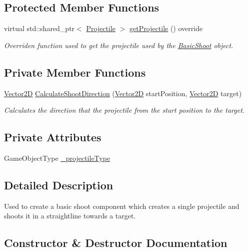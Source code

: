 \subsection*{Protected Member Functions}
\begin{DoxyCompactItemize}
\item 
virtual std\+::shared\+\_\+ptr$<$ \hyperlink{class_projectile}{Projectile} $>$ \hyperlink{class_basic_shoot_ab5058d147ca9d9cc4cc4210e9e092de5}{get\+Projectile} () override
\begin{DoxyCompactList}\small\item\em Overriden function used to get the projectile used by the \hyperlink{class_basic_shoot}{Basic\+Shoot} object. \end{DoxyCompactList}\end{DoxyCompactItemize}
\subsection*{Private Member Functions}
\begin{DoxyCompactItemize}
\item 
\hyperlink{class_vector2_d}{Vector2D} \hyperlink{class_basic_shoot_aafe1225544d200da3e0c084d33dac60a}{Calculate\+Shoot\+Direction} (\hyperlink{class_vector2_d}{Vector2D} start\+Position, \hyperlink{class_vector2_d}{Vector2D} target)
\begin{DoxyCompactList}\small\item\em Calculates the direction that the projectile from the start position to the target. \end{DoxyCompactList}\end{DoxyCompactItemize}
\subsection*{Private Attributes}
\begin{DoxyCompactItemize}
\item 
Game\+Object\+Type \hyperlink{class_basic_shoot_a3dfb89cab41f16d9bcb1e94f521978fe}{\+\_\+projectile\+Type}
\end{DoxyCompactItemize}


\subsection{Detailed Description}
Used to create a basic shoot component which creates a single projectile and shoots it in a straightline towards a target. 

\subsection{Constructor \& Destructor Documentation}
\mbox{\label{class_basic_shoot_a7594a4b840d698baa8d4a51027078727}} 
